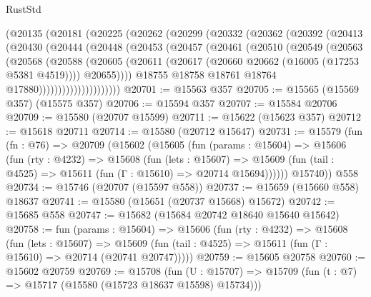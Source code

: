 \begin{lexlean}{RustStd}
\begin{coremodule}
          (@20135
            (@20181
              (@20225
                (@20262
                  (@20299
                    (@20332
                      (@20362
                        (@20392
                          (@20413
                            (@20430
                              (@20444
                                (@20448
                                  (@20453
                                    (@20457
                                      (@20461
                                        (@20510
                                          (@20549
                                            (@20563
                                              (@20568
                                                (@20588
                                                  (@20605
                                                    (@20611
                                                      (@20617
                                                        (@20660
                                                          @20662
                                                          (@16005 (@17253 @5381 @4519))))
                                                      @20655))))
                                              @18755
                                              @18758
                                              @18761
                                              @18764
                                              @17880)))))))))))))))))))))
@20701 := @15563 @357
@20705 := @15565 (@15569 @357) (@15575 @357)
@20706 := @15594 @357
@20707 := @15584 @20706
@20709 := @15580 (@20707 @15599)
@20711 := @15622 (@15623 @357)
@20712 := @15618 @20711
@20714 := @15580 (@20712 @15647)
@20731 := @15579
    (fun (fn : @76) =>
    @20709
      (@15602
        (@15605
          (fun (params : @15604) =>
          @15606
            (fun (rty : @4232) =>
            @15608
              (fun (lets : @15607) =>
              @15609 (fun (tail : @4525) => @15611 (fun (Γ : @15610) => @20714 @15694))))))
        @15740))
    @558
@20734 := @15746 (@20707 (@15597 @558))
@20737 := @15659 (@15660 @558) @18637
@20741 := @15580 (@15651 (@20737 @15668) @15672)
@20742 := @15685 @558
@20747 := @15682 (@15684 @20742 @18640 @15640 @15642)
@20758 := fun (params : @15604) =>
  @15606
    (fun (rty : @4232) =>
    @15608
      (fun (lets : @15607) =>
      @15609 (fun (tail : @4525) => @15611 (fun (Γ : @15610) => @20714 (@20741 @20747)))))
@20759 := @15605 @20758
@20760 := @15602 @20759
@20769 := @15708
    (fun (U : @15707) => @15709 (fun (t : @7) => @15717 (@15580 (@15723 @18637 @15598) @15734)))

\end{coremodule}
\end{lexlean}
